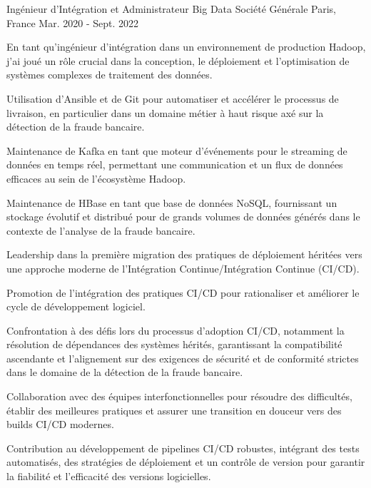 \begin{cventries}
\cventry
{Ingénieur d'Intégration et Administrateur Big Data} %
{Société Générale} %
{Paris, France} %
{Mar. 2020 - Sept. 2022 } %
{
  \begin{cvitems} %
    \item {En tant qu'ingénieur d'intégration dans un environnement de production Hadoop, j'ai joué un rôle crucial dans la conception, le déploiement et l'optimisation de systèmes complexes de traitement des données.}
    \item {Utilisation d'Ansible et de Git pour automatiser et accélérer le processus de livraison, en particulier dans un domaine métier à haut risque axé sur la détection de la fraude bancaire.}
    \item {Maintenance de Kafka en tant que moteur d'événements pour le streaming de données en temps réel, permettant une communication et un flux de données efficaces au sein de l'écosystème Hadoop.}
    \item {Maintenance de HBase en tant que base de données NoSQL, fournissant un stockage évolutif et distribué pour de grands volumes de données générés dans le contexte de l'analyse de la fraude bancaire.}
    \item {Leadership dans la première migration des pratiques de déploiement héritées vers une approche moderne de l'Intégration Continue/Intégration Continue (CI/CD).}
    \item {Promotion de l'intégration des pratiques CI/CD pour rationaliser et améliorer le cycle de développement logiciel.}
    \item {Confrontation à des défis lors du processus d'adoption CI/CD, notamment la résolution de dépendances des systèmes hérités, garantissant la compatibilité ascendante et l'alignement sur des exigences de sécurité et de conformité strictes dans le domaine de la détection de la fraude bancaire.}
    \item {Collaboration avec des équipes interfonctionnelles pour résoudre des difficultés, établir des meilleures pratiques et assurer une transition en douceur vers des builds CI/CD modernes.}
    \item {Contribution au développement de pipelines CI/CD robustes, intégrant des tests automatisés, des stratégies de déploiement et un contrôle de version pour garantir la fiabilité et l'efficacité des versions logicielles.}
  \end{cvitems}  
}


\end{cventries}
